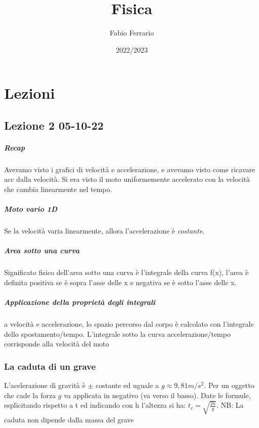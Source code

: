 \documentclass[12pt, a4paper, openany]{book}
\begin{document}
\title{Fisica}
\author{Fabio Ferrario}
\date{2022/2023}
\maketitle


\chapter{Lezioni}
\section*{Lezione 2 05-10-22}
\paragraph*{Recap} Avevamo visto i grafici di velocità e accelerazione, e avevamo visto come ricavare acc dalla velocità.
Si era visto il moto uniformemente accelerato con la velocità che cambia linearmente nel tempo.

\paragraph*{Moto vario 1D} Se la velocità varia linearmente, allora l'accelerazione è \emph{costante}.
\paragraph*{Area sotto una curva} Significato fisico dell'area sotto una curva è l'integrale della curva f(x), l'area è definita positiva se è sopra l'asse delle x e negativa se è sotto l'asse delle x.
\paragraph*{Applicazione della proprietà degli integrali} a velocità e accelerazione, lo spazio percorso dal corpo è calcolato con l'integrale dello spostamento/tempo.
L'integrale sotto la curva accelerazione/tempo corrisponde alla velocità del moto
\subsection*{La caduta di un grave} L'acelerazione di gravità è $\pm$ costante ed uguale a $g\approx 9,81m/s^2$. Per un oggetto che cade la forza $g$ va applicata in negativo (va verso il basso).
Date le formule, esplicitando rispetto a t ed indicando con h l'altezza si ha: $t_c=\sqrt{\frac{2h}{g}}$. NB: La caduta non dipende dalla massa del grave
\end{document}
